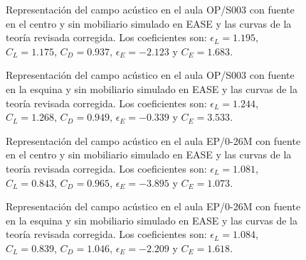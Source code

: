 \begin{figure}[H]
\vspace{-0.2cm}
    \centering%
    {%
    }
    \vspace{-0.2cm}
    \caption{Representación del campo acústico en el aula OP/S003 con fuente en el centro y sin mobiliario simulado en EASE y las curvas de la teoría revisada corregida. Los coeficientes son: $\epsilon_L=1.195$, $C_L=1.175$, $C_D=0.937$, $\epsilon_E=-2.123$ y $C_E=1.683$.}%
    \label{graf:easeopnomobcentro-teoria}%
\end{figure}

\begin{figure}[H]
    \centering%
    {%
    }
    \vspace{-0.2cm}
    \caption{Representación del campo acústico en el aula OP/S003 con fuente en la esquina y sin mobiliario simulado en EASE y las curvas de la teoría revisada corregida. Los coeficientes son: $\epsilon_L=1.244$, $C_L=1.268$, $C_D=0.949$, $\epsilon_E=-0.339$ y $C_E=3.533$.}%
    \label{graf:easeopnomobesquina-teoria}%
    \vspace{-0.2cm}
\end{figure}

\begin{figure}[H]
    \centering%
    {%
    }
    \vspace{-0.2cm}
    \caption{Representación del campo acústico en el aula EP/0-26M con fuente en el centro y sin mobiliario simulado en EASE y las curvas de la teoría revisada corregida. Los coeficientes son: $\epsilon_L=1.081$, $C_L=0.843$, $C_D=0.965$, $\epsilon_E=-3.895$ y $C_E=1.073$.}%
    \label{graf:easeepsnomobcentro-teoria}%
    \vspace{-0.2cm}
\end{figure}

\begin{figure}[H]
    \centering%
    {%
    }
    \vspace{-0.2cm}
    \caption{Representación del campo acústico en el aula EP/0-26M con fuente en la esquina y sin mobiliario simulado en EASE y las curvas de la teoría revisada corregida. Los coeficientes son: $\epsilon_L=1.084$, $C_L=0.839$, $C_D=1.046$, $\epsilon_E=-2.209$ y $C_E=1.618$.}%
    \label{graf:easeepsnomobesquina-teoria}%
    \vspace{-0.2cm}
\end{figure}

